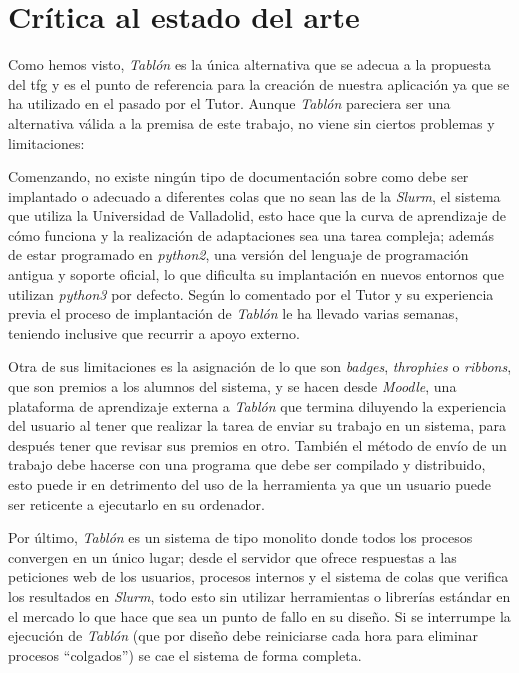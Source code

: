 \documentclass[11pt,spanish,listoffigures,listoftables]{tfgetsinf}
\begin{document}
\section{Crítica al estado del arte}

Como hemos visto, \textit{Tablón} es la única alternativa que se adecua a la propuesta del \acrshort{tfg} y es el punto de referencia para la creación de nuestra aplicación ya que se ha utilizado en el pasado por el Tutor. Aunque \textit{Tablón} pareciera ser una alternativa válida a la premisa de este trabajo, no viene sin ciertos problemas y limitaciones:

Comenzando, no existe ningún tipo de documentación sobre como debe ser implantado o adecuado a diferentes \gls{cola}s que no sean las de la \textit{Slurm}, el sistema que utiliza la Universidad de Valladolid, esto hace que la curva de aprendizaje de cómo funciona y la realización de adaptaciones sea una tarea compleja; además de estar programado en \textit{python2}, una versión del lenguaje de programación antigua y soporte oficial, lo que dificulta su implantación en nuevos entornos que utilizan \textit{python3} por defecto. Según lo comentado por el Tutor y su experiencia previa el proceso de implantación de \textit{Tablón} le ha llevado varias semanas, teniendo inclusive que recurrir a apoyo externo.

Otra de sus limitaciones es la asignación de lo que son \textit{badges}, \textit{throphies} o \textit{ribbons}, que son premios a los alumnos del sistema, y se hacen desde \textit{Moodle}, una plataforma de aprendizaje externa a \textit{Tablón} que termina diluyendo la experiencia del usuario al tener que realizar la tarea de enviar su trabajo en un sistema, para después tener que revisar sus premios en otro. También el método de envío de un trabajo debe hacerse con una programa que debe ser compilado y distribuido, esto puede ir en detrimento del uso de la herramienta ya que un usuario puede ser reticente a ejecutarlo en su ordenador.

Por último, \textit{Tablón} es un sistema de tipo monolito donde todos los procesos convergen en un único lugar; desde el servidor que ofrece respuestas a las peticiones web de los usuarios, procesos internos y el sistema de colas que verifica los resultados en \textit{Slurm}, todo esto sin utilizar herramientas o librerías estándar en el mercado lo que hace que sea un punto de fallo en su diseño. Si se interrumpe la ejecución de \textit{Tablón} (que por diseño debe reiniciarse cada hora para eliminar procesos ``colgados'') se cae el sistema de forma completa.
\end{document}
